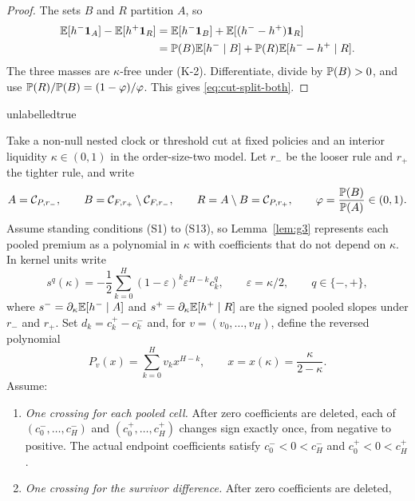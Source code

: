 \begin{proof}
The sets $B$ and $R$ partition $A$, so
\[
\begin{aligned}
\mathbb{E}[h^-\mathbf{1}_A]-\mathbb{E}[h^+\mathbf{1}_R]
&=\mathbb{E}[h^-\mathbf{1}_B]+\mathbb{E}[(h^- -h^+)\mathbf{1}_R]\\
&=\mathbb{P}(B)\mathbb{E}[h^-\mid B]
  +\mathbb{P}(R)\mathbb{E}[h^- -h^+\mid R].
\end{aligned}
\]
The three masses are $\kappa$-free under (K-2). Differentiate, divide by $\mathbb{P}(B)>0$, and use
$\mathbb{P}(R)/\mathbb{P}(B)=(1-\varphi)/\varphi$. This gives
\eqref{eq:cut-split-both}.
\end{proof}

\csname unlabelledtrue\endcsname
\begin{lemma}
\label{lem:one-crossing}
Take a non-null nested clock or threshold cut at fixed policies and an interior liquidity
$\kappa\in(0,1)$ in the order-size-two model. Let $r_-$ be the looser rule and
$r_+$ the tighter rule, and write
\[
A=\mathcal C_{P,r_-},
\qquad
B=\mathcal C_{F,r_+}\setminus\mathcal C_{F,r_-},
\qquad
R=A\setminus B=\mathcal C_{P,r_+},
\qquad
\varphi=\frac{\mathbb{P}(B)}{\mathbb{P}(A)}\in(0,1).
\]
Assume standing conditions (S1) to (S13), so
Lemma~\ref{lem:g3} represents each pooled premium as a polynomial in $\kappa$ with coefficients that
do not depend on $\kappa$. In kernel units write
\begin{equation}
\label{eq:one-crossing-slopes}
s^q(\kappa)=-\frac12\sum_{k=0}^{H}(1-\varepsilon)^k\varepsilon^{H-k}c_k^q,
\qquad \varepsilon=\kappa/2,
\qquad q\in\{-,+\},
\end{equation}
where
$s^-=\partial_\kappa\mathbb{E}[h^-\mid A]$ and
$s^+=\partial_\kappa\mathbb{E}[h^+\mid R]$ are the signed pooled slopes under $r_-$ and $r_+$. Set
$d_k=c_k^+-c_k^-$ and, for $v=(v_0,\ldots,v_H)$, define the reversed polynomial
\begin{equation}
\label{eq:one-crossing-polynomial}
P_v(x)=\sum_{k=0}^{H}v_kx^{H-k},
\qquad x=x(\kappa)=\frac{\kappa}{2-\kappa}.
\end{equation}
Assume:
\begin{enumerate}[label=(R\arabic*),leftmargin=3.0em,itemsep=3pt]
\item \emph{One crossing for each pooled cell.} After zero coefficients are deleted, each of
  $(c_0^-,\ldots,c_H^-)$ and $(c_0^+,\ldots,c_H^+)$ changes sign exactly once, from negative to
  positive. The actual endpoint coefficients satisfy $c_0^-<0<c_H^-$ and $c_0^+<0<c_H^+$.
\item \emph{One crossing for the survivor difference.} After zero coefficients are deleted,

\end{enumerate}
\end{lemma}
